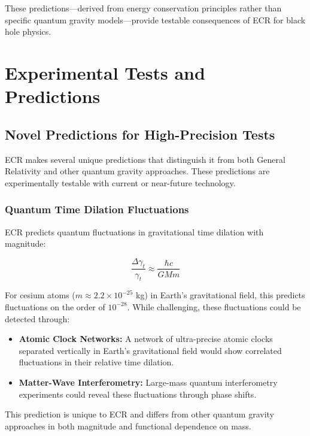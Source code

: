 \documentclass[11pt,a4paper]{article}
\begin{document}
These predictions—derived from energy conservation principles rather than specific quantum gravity models—provide testable consequences of ECR for black hole physics.

\section{Experimental Tests and Predictions}\label{sec:tests}

\subsection{Novel Predictions for High-Precision Tests}

ECR makes several unique predictions that distinguish it from both General Relativity and other quantum gravity approaches. These predictions are experimentally testable with current or near-future technology.

\subsubsection{Quantum Time Dilation Fluctuations}

ECR predicts quantum fluctuations in gravitational time dilation with magnitude:

\begin{equation}
    \frac{\Delta\gamma_t}{\gamma_t} \approx \frac{\hbar c}{GMm}
\end{equation}

For cesium atoms ($m \approx 2.2 \times 10^{-25}$ kg) in Earth's gravitational field, this predicts fluctuations on the order of $10^{-28}$. While challenging, these fluctuations could be detected through:

\begin{itemize}
    \item \textbf{Atomic Clock Networks:} A network of ultra-precise atomic clocks separated vertically in Earth's gravitational field would show correlated fluctuations in their relative time dilation.
    
    \item \textbf{Matter-Wave Interferometry:} Large-mass quantum interferometry experiments could reveal these fluctuations through phase shifts.
\end{itemize}

This prediction is unique to ECR and differs from other quantum gravity approaches in both magnitude and functional dependence on mass.
\end{document}
